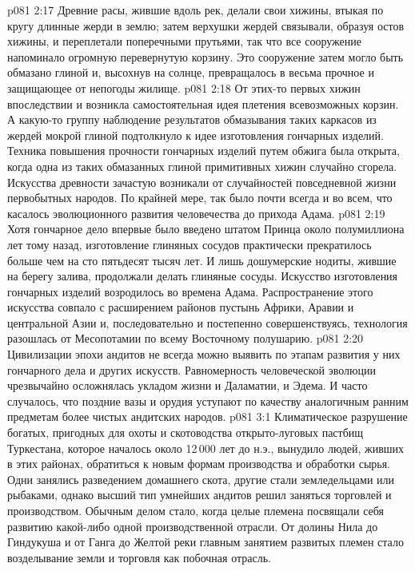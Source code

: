 \vs p081 2:17 Древние расы, жившие вдоль рек, делали свои хижины, втыкая по кругу длинные жерди в землю; затем верхушки жердей связывали, образуя остов хижины, и переплетали поперечными прутьями, так что все сооружение напоминало огромную перевернутую корзину. Это сооружение затем могло быть обмазано глиной и, высохнув на солнце, превращалось в весьма прочное и защищающее от непогоды жилище.
\vs p081 2:18 От этих\hyp{}то первых хижин впоследствии и возникла самостоятельная идея плетения всевозможных корзин. А какую\hyp{}то группу наблюдение результатов обмазывания таких каркасов из жердей мокрой глиной подтолкнуло к идее изготовления гончарных изделий. Техника повышения прочности гончарных изделий путем обжига была открыта, когда одна из таких обмазанных глиной примитивных хижин случайно сгорела. Искусства древности зачастую возникали от случайностей повседневной жизни первобытных народов. По крайней мере, так было почти всегда и во всем, что касалось эволюционного развития человечества до прихода Адама.
\vs p081 2:19 Хотя гончарное дело впервые было введено штатом Принца около полумиллиона лет тому назад, изготовление глиняных сосудов практически прекратилось больше чем на сто пятьдесят тысяч лет. И лишь дошумерские нодиты, жившие на берегу залива, продолжали делать глиняные сосуды. Искусство изготовления гончарных изделий возродилось во времена Адама. Распространение этого искусства совпало с расширением районов пустынь Африки, Аравии и центральной Азии и, последовательно и постепенно совершенствуясь, технология разошлась от Месопотамии по всему Восточному полушарию.
\vs p081 2:20 Цивилизации эпохи андитов не всегда можно выявить по этапам развития у них гончарного дела и других искусств. Равномерность человеческой эволюции чрезвычайно осложнялась укладом жизни и Даламатии, и Эдема. И часто случалось, что поздние вазы и орудия уступают по качеству аналогичным ранним предметам более чистых андитских народов.
\vs p081 3:1 Климатическое разрушение богатых, пригодных для охоты и скотоводства открыто\hyp{}луговых пастбищ Туркестана, которое началось около 12\,000 лет до н.э., вынудило людей, живших в этих районах, обратиться к новым формам производства и обработки сырья. Одни занялись разведением домашнего скота, другие стали земледельцами или рыбаками, однако высший тип умнейших андитов решил заняться торговлей и производством. Обычным делом стало, когда целые племена посвящали себя развитию какой\hyp{}либо одной производственной отрасли. От долины Нила до Гиндукуша и от Ганга до Желтой реки главным занятием развитых племен стало возделывание земли и торговля как побочная отрасль.
